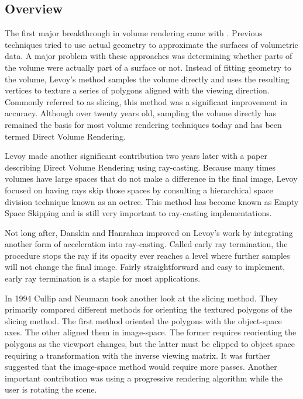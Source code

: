 \documentclass{article}
\begin{document}
\subsection{Overview}

The first major breakthrough in volume rendering came with \cite{Levoy88}.
Previous techniques tried to use actual geometry to approximate the surfaces of
volumetric data.  A major problem with these approaches was determining whether
parts of the volume were actually part of a surface or not.  Instead of fitting
geometry to the volume, Levoy’s method samples the volume directly and uses the
resulting vertices to texture a series of polygons aligned with the viewing
direction.  Commonly referred to as slicing, this method was a significant
improvement in accuracy.  Although over twenty years old, sampling the volume
directly has remained the basis for most volume rendering techniques today and
has been termed Direct Volume Rendering.

Levoy made another significant contribution two years later with a paper
\cite{Levoy90} describing Direct Volume Rendering using ray-casting.  Because
many times volumes have large spaces that do not make a difference in the final
image, Levoy focused on having rays skip those spaces by consulting a
hierarchical space division technique known as an octree.  This method has
become known as Empty Space Skipping and is still very important to ray-casting
implementations.

Not long after, Danskin and Hanrahan \cite{Danskin92} improved on Levoy’s work
by integrating another form of acceleration into ray-casting.  Called early ray
termination, the procedure stops the ray if its opacity ever reaches a level
where further samples will not change the final image.  Fairly straightforward
and easy to implement, early ray termination is a staple for most applications.

In 1994 Cullip and Neumann \cite{Cullip94} took another look at the slicing
method.  They primarily compared different methods for orienting the textured
polygons of the slicing method.  The first method oriented the polygons with the
object-space axes.  The other aligned them in image-space.  The former requires
reorienting the polygons as the viewport changes, but the latter must be clipped
to object space requiring a transformation with the inverse viewing matrix.  It
was further suggested that the image-space method would require more passes.
Another important contribution was using a progressive rendering algorithm while
the user is rotating the scene.
\end{document}
